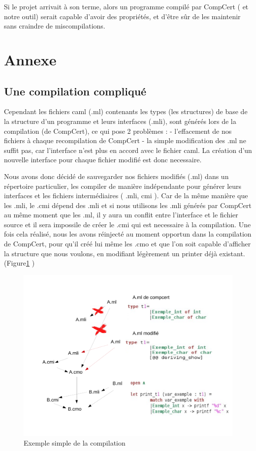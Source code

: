 	Si le projet arrivait à son terme, alors un programme compilé par CompCert ( et notre outil) serait capable d'avoir des propriétés, et d'être sûr de les maintenir sans craindre de miscompilations.

\section{Annexe}

\subsection{Une compilation compliqué}
\label{Annexe:1}
Cependant les fichiers caml (.ml) contenants les types (les structures) de base de la structure d'un programme et leurs interfaces (.mli), sont générés lors de la compilation (de CompCert), ce qui pose 2 problèmes :\break
- l'effacement de nos fichiers à chaque recompilation de CompCert\break
- la simple modification des .ml ne suffit pas, car l'interface n'est plus en accord avec le fichier caml. La création d'un nouvelle interface pour chaque fichier modifié est donc necessaire.

Nous avons donc décidé de sauvegarder nos fichiers modifiés (.ml) dans un répertoire particulier, les compiler de manière indépendante pour générer leurs interfaces et les fichiers intermédiaires ( .mli, cmi ). Car de la même manière que les .mli, le .cmi dépend des .mli et si nous utilisons les .mli  générés par CompCert au même moment que les .ml, il y aura un conflit entre l'interface et le fichier source et il sera impossile de créer le .cmi qui est necessaire à la compilation. 
Une fois cela réalisé, nous les avons réinjecté au moment opportun dans la compilation de CompCert, pour qu'il créé lui même les .cmo et que l'on soit capable d'afficher la structure que nous voulons, en modifiant légèrement un printer déjà existant.(Figure\ref{fig:7} )

\begin{figure}[t]

 \includegraphics[width=12cm\textwidth,height=8cm \texteheight]{explication_de_la_compilation.pdf}
\caption{\label{fig:7} Exemple simple de la compilation }

\end{figure}

